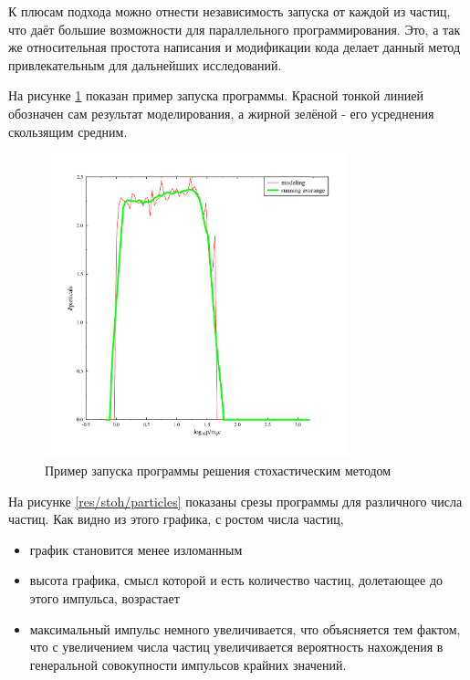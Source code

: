 \documentclass[a4paper,14pt]{extarticle} %
\begin{document}
К плюсам подхода можно отнести независимость запуска от каждой из частиц, что даёт большие возможности для параллельного программирования. Это, а так же относительная простота написания и модификации кода делает данный метод привлекательным для дальнейших исследований.

На рисунке \ref{res/stoh/common} показан пример запуска программы. Красной тонкой линией обозначен сам результат моделирования, а жирной зелёной - его усреднения скользящим средним.


\begin{figure}[!htb]
\centering
\includegraphics[width=250pt]{stoh_bom_one}
\caption{Пример запуска программы решения стохастическим методом}
\label{res/stoh/common}
\end{figure}
На рисунке \ref{res/stoh/particles} показаны срезы программы для различного числа частиц. Как видно из этого графика, с ростом числа частиц,
\begin{itemize}
\item график становится менее изломанным
\item высота графика, смысл которой и есть количество частиц, долетающее до этого импульса, возрастает
\item максимальный импульс немного увеличивается, что объясняется тем фактом, что с увеличением числа частиц увеличивается вероятность нахождения в генеральной совокупности импульсов крайних значений.
\end{itemize}
\end{document}
